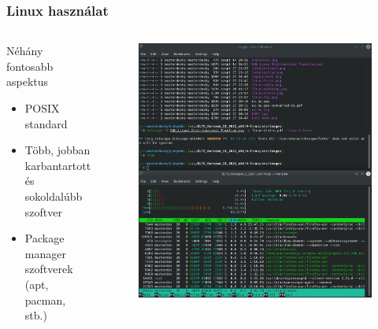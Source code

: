 \begin{frame}
\frametitle{Linux használat}

\begin{columns}
	\begin{block}{Néhány fontosabb aspektus}
		\begin{itemize}
			\item POSIX standard
			\item Több, jobban karbantartott és sokoldalúbb szoftver
			\item Package manager szoftverek (apt, pacman, stb.)
		\end{itemize}
	\end{block}
	

	\begin{figure}
		\includegraphics[width=1.0\textwidth]{images/linux-deskptop.png}
	\end{figure}

\end{columns}
\end{frame}

